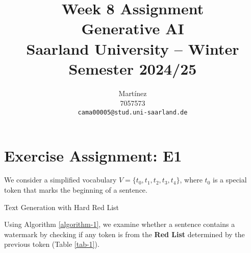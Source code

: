 \documentclass{article}
\title{Week 8 Assignment\\
\vspace{2mm}
\small{Generative AI}
\\
\vspace{2mm}
\small{Saarland University -- Winter Semester 2024/25}
}
\author{%
  Martínez \\
  7057573 \\
  \texttt{cama00005@stud.uni-saarland.de} \\
}
\begin{document}
\DeclareRobustCommand{\textitbf}[1]{\textbf{\textit{#1}}} %

\maketitle

\section{Exercise Assignment: E1}\label{sec:e1}

We consider a simplified vocabulary $V = \{t_0, t_1, t_2, t_3, t_4\}$, where $t_0$ is a special token that marks the beginning of a sentence.

\begin{algorithm}[H]
    \caption{Text Generation with Hard Red List \cite{kirchenbauer2024watermarklargelanguagemodels}}
    \label{algorithm-1}
\end{algorithm}


Using Algorithm \ref{algorithm-1}, we examine whether a sentence contains a watermark by checking if any token is from the \textbf{Red List} determined by the previous token (Table \ref{tab-1}).
\end{document}
